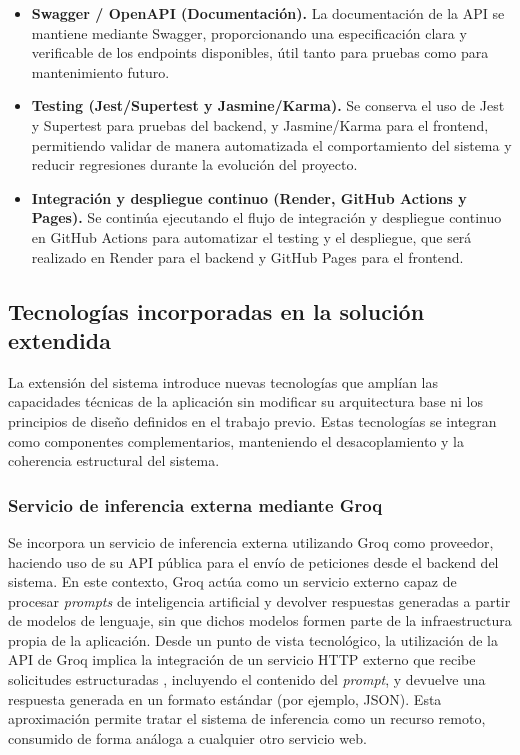 \begin{itemize}
    \item \textbf{Swagger / OpenAPI (Documentación).}  
    La documentación de la API se mantiene mediante Swagger, proporcionando una especificación clara y verificable de los endpoints disponibles, útil tanto para pruebas como para mantenimiento futuro.

    \item \textbf{Testing (Jest/Supertest y Jasmine/Karma).}  
    Se conserva el uso de Jest y Supertest para pruebas del backend, y Jasmine/Karma para el frontend, permitiendo validar de manera automatizada el comportamiento del sistema y reducir regresiones durante la evolución del proyecto.
    
    \item \textbf{Integración y despliegue continuo (Render, GitHub Actions y Pages).}
    Se continúa ejecutando el flujo de integración y despliegue continuo en GitHub Actions para automatizar el testing y el despliegue, que será realizado en Render para el backend y GitHub Pages para el frontend.
\end{itemize}

\subsection{Tecnologías incorporadas en la solución extendida}

La extensión del sistema introduce nuevas tecnologías que amplían las capacidades técnicas de la aplicación sin modificar su arquitectura base ni los principios de diseño definidos en el trabajo previo. Estas tecnologías se integran como componentes complementarios, manteniendo el desacoplamiento y la coherencia estructural del sistema.

\subsubsection{Servicio de inferencia externa mediante Groq}

Se incorpora un servicio de inferencia externa utilizando Groq \cite{groq_docs} como proveedor, haciendo uso de su API pública para el envío de peticiones desde el backend del sistema. En este contexto, Groq actúa como un servicio externo capaz de procesar \textit{prompts} de inteligencia artificial y devolver respuestas generadas a partir de modelos de lenguaje, sin que dichos modelos formen parte de la infraestructura propia de la aplicación.
\newpage
Desde un punto de vista tecnológico, la utilización de la API de Groq implica la integración de un servicio HTTP externo que recibe solicitudes estructuradas \cite{RFC9110}, incluyendo el contenido del \textit{prompt}, y devuelve una respuesta generada en un formato estándar (por ejemplo, JSON). Esta aproximación permite tratar el sistema de inferencia como un recurso remoto, consumido de forma análoga a cualquier otro servicio web.

